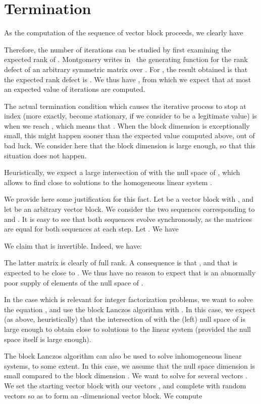\section{Termination}
\label{sec:blocklanczos:termination}

As the computation of the sequence of vector block proceeds, we clearly
have

Therefore, the number of iterations can be studied by first examining the
expected rank of . Montgomery writes
in~\cite{EC:Montgomery95} the generating
function for the rank defect of an arbitrary  symmetric matrix
over . For , the result obtained is that the expected rank
defect is . We thus have
, from which we expect
that at most an expected value of  iterations are
computed.


The actual termination condition which causes the iterative process to stop at index
 (more
exactly, become stationary, if we consider  to
be a legitimate value) is when we reach , which means that
. When the block dimension  is exceptionally small,
this might happen sooner than the expected value computed above, out of bad luck. We consider here that the block
dimension is large enough, so that this situation does not happen.

Heuristically, we expect a large intersection of
 with the null space of , which allows to find
close to  solutions to the homogeneous linear system .

We provide here some justification for this fact. Let  be a
vector block with , and let  be an arbitrary
vector block.  We consider the two sequences corresponding to 
and .  It is easy to see that both sequences
evolve synchronously, as the matrices  are equal for
both sequences at each step.  Let
.
We have

We claim that  is invertible. Indeed, we have:

The latter matrix is clearly of full rank. A consequence is that
, and that  is
expected to be close to . We thus have no reason to expect
that  is an abnormally poor supply of elements of the null space
of .


In the case which is relevant for integer factorization problems, we want
to solve the equation , and use the block Lanczos algorithm with
. In this case, we expect (as above, heuristically) that the intersection of
 with the (left) null space of  is large enough
to obtain close to   solutions to the linear system (provided the null
space itself is large enough).
\medskip

The block Lanczos algorithm can also be used to solve
inhomogeneous linear systems, to some extent.
In this case, we assume that the null space dimension is small compared
to the block dimension . We want to solve  for several vectors .
We set the starting vector block  with our vectors , and
complete with random vectors so as to form an -dimensional vector block. We compute

